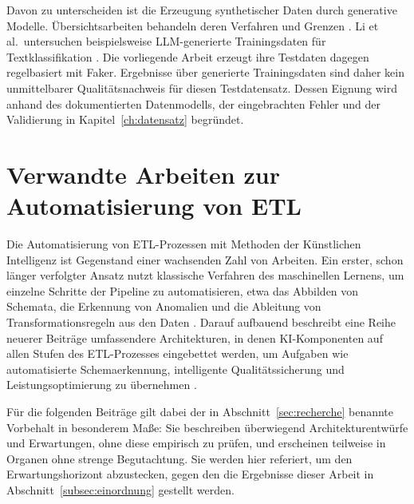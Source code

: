 Davon zu unterscheiden ist die Erzeugung synthetischer Daten durch generative Modelle. Übersichtsarbeiten behandeln deren Verfahren und Grenzen \autocite{longLLMsDrivenSyntheticData2024,fonsecaTabularLatentSpace2023,goyalSystematicReviewSynthetic2024}. Li et al.\ untersuchen beispielsweise LLM-generierte Trainingsdaten für Textklassifikation \autocite{liSyntheticDataGeneration2023}. Die vorliegende Arbeit erzeugt ihre Testdaten dagegen regelbasiert mit Faker. Ergebnisse über generierte Trainingsdaten sind daher kein unmittelbarer Qualitätsnachweis für diesen Testdatensatz. Dessen Eignung wird anhand des dokumentierten Datenmodells, der eingebrachten Fehler und der Validierung in Kapitel~\ref{ch:datensatz} begründet.

\section{Verwandte Arbeiten zur Automatisierung von ETL}
\label{sec:verwandte-arbeiten}

Die Automatisierung von \ac{ETL}-Prozessen mit Methoden der Künstlichen Intelligenz ist Gegenstand einer wachsenden Zahl von Arbeiten. Ein erster, schon länger verfolgter Ansatz nutzt klassische Verfahren des maschinellen Lernens, um einzelne Schritte der Pipeline zu automatisieren, etwa das Abbilden von Schemata, die Erkennung von Anomalien und die Ableitung von Transformationsregeln aus den Daten \autocite{mishraAutomatingDataIntegration2020,reddyAIDrivenDataIntegration2025}. Darauf aufbauend beschreibt eine Reihe neuerer Beiträge umfassendere Architekturen, in denen \ac{KI}-Komponenten auf allen Stufen des \ac{ETL}-Prozesses eingebettet werden, um Aufgaben wie automatisierte Schemaerkennung, intelligente Qualitätssicherung und Leistungsoptimierung zu übernehmen \autocite{walhaDataIntegrationTraditional2024,kasireddyRoleAIModern2026}.

Für die folgenden Beiträge gilt dabei der in Abschnitt~\ref{sec:recherche} benannte Vorbehalt in besonderem Maße: Sie beschreiben überwiegend Architekturentwürfe und Erwartungen, ohne diese empirisch zu prüfen, und erscheinen teilweise in Organen ohne strenge Begutachtung. Sie werden hier referiert, um den Erwartungshorizont abzustecken, gegen den die Ergebnisse dieser Arbeit in Abschnitt~\ref{subsec:einordnung} gestellt werden.

